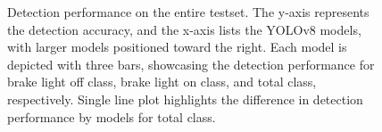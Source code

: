 \begin{figure}[t]%


\caption{Detection performance on the entire testset. The y-axis represents the detection accuracy, and the x-axis lists the YOLOv8 models, with larger models positioned toward the right. Each model is depicted with three bars, showcasing the detection performance for brake light off class, brake light on class, and total class, respectively. Single line plot highlights the difference in detection performance by models for total class.}
\label{fig:test_results}%
\end{figure}



